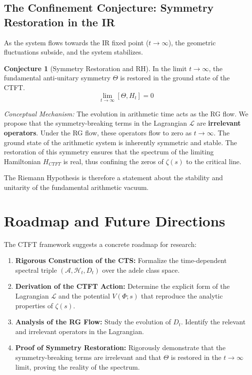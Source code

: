 \documentclass[11pt, a4paper]{article}
\theoremstyle{definition}
\newtheorem{conjecture}{Conjecture}[section]
\newcommand{\Lagr}{\mathcal{L}}
\newcommand{\Hilb}{\mathcal{H}}
\newcommand{\Alg}{\mathscr{A}}
\begin{document}
\subsection{The Confinement Conjecture: Symmetry Restoration in the IR}
As the system flows towards the IR fixed point ($t\to\infty$), the geometric fluctuations subside, and the system stabilizes.

\begin{conjecture}[Symmetry Restoration and RH]
In the limit $t\to\infty$, the fundamental anti-unitary symmetry $\Theta$ is restored in the ground state of the CTFT.
$$ \lim_{t\to\infty} [\Theta, H_t] = 0 $$
\end{conjecture}

\textit{Conceptual Mechanism:} The evolution in arithmetic time acts as the RG flow. We propose that the symmetry-breaking terms in the Lagrangian $\Lagr$ are \textbf{irrelevant operators}. Under the RG flow, these operators flow to zero as $t\to\infty$. The ground state of the arithmetic system is inherently symmetric and stable. The restoration of this symmetry ensures that the spectrum of the limiting Hamiltonian $H_{CTFT}$ is real, thus confining the zeros of $\zeta(s)$ to the critical line.

The Riemann Hypothesis is therefore a statement about the stability and unitarity of the fundamental arithmetic vacuum.

\section{Roadmap and Future Directions}
The CTFT framework suggests a concrete roadmap for research:
\begin{enumerate}
    \item \textbf{Rigorous Construction of the CTS:} Formalize the time-dependent spectral triple $(\Alg, \Hilb_t, D_t)$ over the adele class space.
    \item \textbf{Derivation of the CTFT Action:} Determine the explicit form of the Lagrangian $\Lagr$ and the potential $V(\Phi; s)$ that reproduce the analytic properties of $\zeta(s)$.
    \item \textbf{Analysis of the RG Flow:} Study the evolution of $D_t$. Identify the relevant and irrelevant operators in the Lagrangian.
    \item \textbf{Proof of Symmetry Restoration:} Rigorously demonstrate that the symmetry-breaking terms are irrelevant and that $\Theta$ is restored in the $t\to\infty$ limit, proving the reality of the spectrum.
\end{enumerate}
\end{document}
